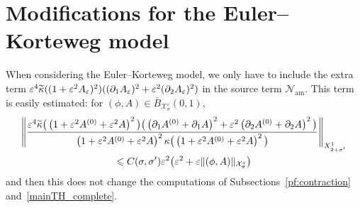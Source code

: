 \documentclass[AHL,Unicode,longabstracts,published]{cedram}
\newcommand*\p{\partial}
\newcommand{\amm}{\mathrm{am}}
\newcommand*\BN{\mathcal{N}}
\newcommand*\BX{\mathcal{X}}
\newcommand*\ls{\leqslant }
\newcommand*\e{\varepsilon}
\renewcommand*\t{\tilde}
\newcommand*\s{\sigma}
\let\oldtilde\tilde
\renewcommand*{\tilde}[1]{\mathchoice{\widetilde{#1}}{\widetilde{#1}}{\oldtilde{#1}}{\oldtilde{#1}}}
\begin{document}
\section{Modifications for the Euler--Korteweg model}

When considering the Euler--Korteweg model, we only have to include the extra term $ \e^4 \t\kappa ((1+ \e^2 A_\e)^2 ) ((\p_{1} A_\e)^2 + \e^2 (\p_{2} A_\e)^2) $ in the source term $ \BN_{\amm} $. This term is easily estimated: for $ (\phi, A) \in \bar{B}_{\BX^\e_{\s}} (0, 1) $,
\begin{multline*}
 \left\| \frac{\e^4 \t\kappa \big(\left(1+\e^2 A^{(0)} + \e^2 A\right)^2 \big)
\big(\left(\p_{1} A^{(0)} + \p_{1} A\right)^2 + \e^2 \left(\p_{2} A^{(0)} + \p_{2} A\right)^2 \big)}{\left(1+\e^2 A^{(0)} + \e^2 A\right)^2 \kappa \big(\left(1+\e^2 A^{(0)} + \e^2 A\right)^2 \big) }
\right\|_{X^1_{2+\s'}}
\\  \ls C (\s, \s') \e^2 \big(\e^2 + \e \| (\phi, A) \|_{\BX^\e_{\s}} \big)
\end{multline*}
and then this does not change the computations of Subsections~\ref{pf:contraction} and~\ref{mainTH_complete}.




\end{document}
